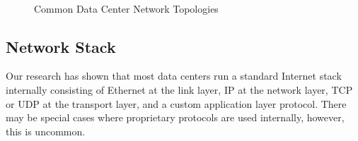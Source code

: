 \captionsetup[subfloat]{captionskip=-0.003in}
\begin{figure}
    \centering
    \\
    \vspace{-0.1in}
    \vspace{-0.07in}
    \caption{Common Data Center Network Topologies}
    \label{fig:common_topos}
\end{figure}


\subsection {Network Stack}

Our research has shown that most data centers run a standard Internet stack internally consisting of Ethernet at the link layer, IP at the network layer, TCP or UDP at the transport layer, and a custom application layer protocol.  There may be special cases where proprietary protocols are used internally, however, this is uncommon.
